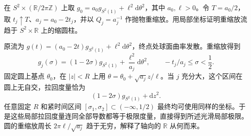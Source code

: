 \begin{exercise}\label{g3:ex:ricci-cylinder-blowup}
在 \(S^2\times(\mathbb R/2\pi\mathbb Z)\) 上取 \(g_0=a_0g_{S^2(1)}+\ell^2\mathrm d\theta^2\)，其中 \(a_0,\ell>0\)。令 \(T=a_0/2\)，取 \(t_j\uparrow T\)、\(a_j=a_0-2t_j\)，并以 \(Q_j=a_j^{-1}\) 作抛物重缩放。用局部坐标证明重缩放流趋于 \(S^2\times\mathbb R\) 上的缩圆柱。
\end{exercise}
\begin{solution}
原流为 \(g(t)=(a_0-2t)g_{S^2(1)}+\ell^2\mathrm d\theta^2\)，终点处球面曲率发散。重缩放得到
\[
g_j(\sigma)=(1-2\sigma)g_{S^2(1)}
+\frac{\ell^2}{a_j}\mathrm d\theta^2,\qquad
-t_j/a_j\le\sigma<\frac12.
\]
固定圆上基点 \(\theta_0\)，在 \(|z|<R\) 上用 \(\theta=\theta_0+\sqrt{a_j}z/\ell\)。当 \(j\) 充分大，这个区间在圆上无自交，拉回度量恰为
\[
(1-2\sigma)g_{S^2(1)}+\mathrm dz^2.
\]
任意固定 \(R\) 和紧时间区间 \([\sigma_1,\sigma_2]\subset(-\infty,1/2)\) 最终均可使用同样的坐标。于是这些局部拉回度量连同全部导数都等于极限度量，直接得到所述光滑局部极限。圆的重缩放周长 \(2\pi\ell/\sqrt{a_j}\) 趋于无穷，解释了轴向的 \(\mathbb R\) 从何而来。
\end{solution}
